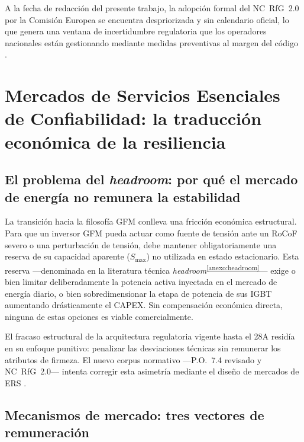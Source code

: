 A la fecha de redacción del presente trabajo, la adopción formal del
NC~RfG~2.0 por la Comisión Europea se encuentra despriorizada y sin
calendario oficial, lo que genera una ventana de incertidumbre
regulatoria que los operadores nacionales están gestionando mediante
medidas preventivas al margen del código \cite{gobierno2025}.

\section{Mercados de Servicios Esenciales de Confiabilidad: la
traducción económica de la resiliencia}
\label{sec:mercados_ers}

\subsection{El problema del \textit{headroom}: por qué el mercado de
energía no remunera la estabilidad}
\label{subsec:headroom}

La transición hacia la filosofía GFM conlleva una fricción económica
estructural. Para que un inversor GFM pueda actuar como fuente de tensión
ante un RoCoF severo o una perturbación de tensión, debe mantener
obligatoriamente una reserva de su capacidad aparente ($S_{\max}$) no
utilizada en estado estacionario. Esta reserva ---denominada en la
literatura técnica \textit{headroom}\textsuperscript{\ref{anexo:headroom}}---
exige o bien limitar deliberadamente la potencia activa inyectada en el
mercado de energía diario, o bien sobredimensionar la etapa de potencia
de sus IGBT aumentando drásticamente el CAPEX. Sin compensación económica
directa, ninguna de estas opciones es viable comercialmente.

El fracaso estructural de la arquitectura regulatoria vigente hasta el
28A residía en su enfoque punitivo: penalizar las desviaciones técnicas
sin remunerar los atributos de firmeza. El nuevo corpus normativo
---P.O.~7.4 revisado y NC~RfG~2.0--- intenta corregir esta asimetría
mediante el diseño de mercados de ERS \cite{entsoe2025,gobierno2025}.

\subsection{Mecanismos de mercado: tres vectores de remuneración}
\label{subsec:ers_mecanismos}

